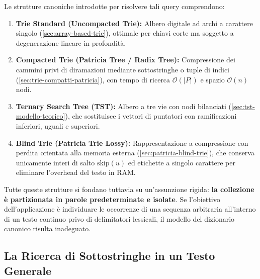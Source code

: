 Le strutture canoniche introdotte per risolvere tali query comprendono:
\begin{enumerate}
  \item \textbf{Trie Standard (Uncompacted Trie):} Albero digitale ad archi a carattere singolo (\autoref{sec:array-based-trie}), ottimale per chiavi corte ma soggetto a degenerazione lineare in profondit\`a.
  \item \textbf{Compacted Trie (Patricia Tree / Radix Tree):} Compressione dei cammini privi di diramazioni mediante sottostringhe o tuple di indici (\autoref{sec:trie-compatti-patricia}), con tempo di ricerca $\mathcal{O}(|P|)$ e spazio $\mathcal{O}(n)$ nodi.
  \item \textbf{Ternary Search Tree (TST):} Albero a tre vie con nodi bilanciati (\autoref{sec:tst-modello-teorico}), che sostituisce i vettori di puntatori con ramificazioni inferiori, uguali e superiori.
  \item \textbf{Blind Trie (Patricia Trie Lossy):} Rappresentazione a compressione con perdita orientata alla memoria esterna (\autoref{sec:patricia-blind-trie}), che conserva unicamente interi di salto $\text{skip}(u)$ ed etichette a singolo carattere per eliminare l'overhead del testo in RAM.
\end{enumerate}

Tutte queste strutture si fondano tuttavia su un'assunzione rigida: \textbf{la collezione \`e partizionata in parole predeterminate e isolate}. Se l'obiettivo dell'applicazione \`e individuare le occorrenze di una sequenza arbitraria all'interno di un testo continuo privo di delimitatori lessicali, il modello del dizionario canonico risulta inadeguato.

\FloatBarrier
\subsection{La Ricerca di Sottostringhe in un Testo Generale}
\label{subsec:substring-search-formalizzazione}

